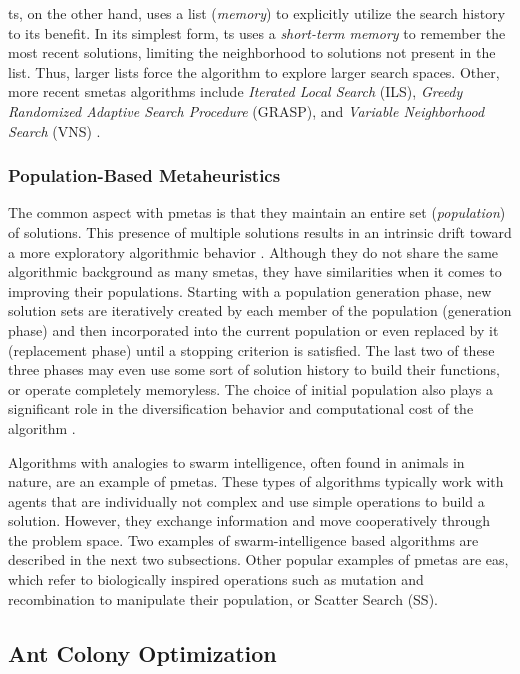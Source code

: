 \Gls{ts}, on the other hand, uses a list (\textit{memory}) to explicitly utilize the search history to its benefit. In its simplest form, \gls{ts} uses a \textit{short-term memory} to remember the most recent solutions, limiting the neighborhood to solutions not present in the list. Thus, larger lists force the algorithm to explore larger search spaces.
Other, more recent \glspl{smeta} algorithms include \textit{Iterated Local Search} (ILS), \textit{Greedy Randomized Adaptive Search Procedure} (GRASP), and \textit{Variable Neighborhood Search} (VNS) \cite{talbi2009metaheuristics}.

\subsubsection{Population-Based Metaheuristics}

The common aspect with \glspl{pmeta} is that they maintain an entire set (\textit{population}) of solutions. This presence of multiple solutions results in an intrinsic drift toward a more exploratory algorithmic behavior \cite{blum2003metaheuristics}. 
Although they do not share the same algorithmic background as many \glspl{smeta}, they have similarities when it comes to improving their populations. Starting with a population generation phase, new solution sets are iteratively created by each member of the population (generation phase) and then incorporated into the current population or even replaced by it (replacement phase) until a stopping criterion is satisfied. The last two of these three phases may even use some sort of solution history to build their functions, or operate completely memoryless. The choice of initial population also plays a significant role in the diversification behavior and computational cost of the algorithm  \cite{talbi2009metaheuristics}. 

Algorithms with analogies to swarm intelligence, often found in animals in nature, are an example of \glspl{pmeta}. These types of algorithms typically work with agents that are individually not complex and use simple operations to build a solution. However, they exchange information and move cooperatively through the problem space. Two examples of swarm-intelligence based algorithms are described in the next two subsections. Other popular examples of \glspl{pmeta} are \glspl{ea}, which refer to biologically inspired operations such as mutation and recombination to manipulate their population, or Scatter Search (SS).


\subsection{Ant Colony Optimization}
\label{chap:aco}

